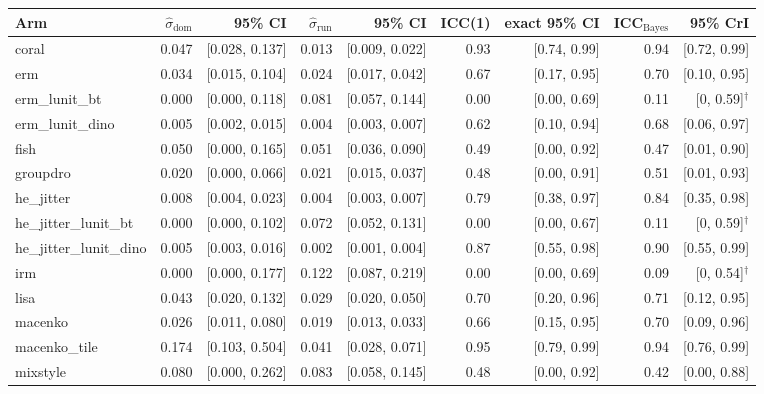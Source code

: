 \begin{tabular}{lrrrrrrrr}
\toprule
Arm & $\hat\sigma_\text{dom}$ & 95\% CI & $\hat\sigma_\text{run}$ & 95\% CI & ICC(1) & exact 95\% CI & ICC$_\text{Bayes}$ & 95\% CrI \\
\midrule
coral & 0.047 & [0.028, 0.137] & 0.013 & [0.009, 0.022] & 0.93 & [0.74, 0.99] & 0.94 & [0.72, 0.99] \\
erm & 0.034 & [0.015, 0.104] & 0.024 & [0.017, 0.042] & 0.67 & [0.17, 0.95] & 0.70 & [0.10, 0.95] \\
erm\_lunit\_bt & 0.000 & [0.000, 0.118] & 0.081 & [0.057, 0.144] & 0.00 & [0.00, 0.69] & 0.11 & [0, 0.59]$^\dagger$ \\
erm\_lunit\_dino & 0.005 & [0.002, 0.015] & 0.004 & [0.003, 0.007] & 0.62 & [0.10, 0.94] & 0.68 & [0.06, 0.97] \\
fish & 0.050 & [0.000, 0.165] & 0.051 & [0.036, 0.090] & 0.49 & [0.00, 0.92] & 0.47 & [0.01, 0.90] \\
groupdro & 0.020 & [0.000, 0.066] & 0.021 & [0.015, 0.037] & 0.48 & [0.00, 0.91] & 0.51 & [0.01, 0.93] \\
he\_jitter & 0.008 & [0.004, 0.023] & 0.004 & [0.003, 0.007] & 0.79 & [0.38, 0.97] & 0.84 & [0.35, 0.98] \\
he\_jitter\_lunit\_bt & 0.000 & [0.000, 0.102] & 0.072 & [0.052, 0.131] & 0.00 & [0.00, 0.67] & 0.11 & [0, 0.59]$^\dagger$ \\
he\_jitter\_lunit\_dino & 0.005 & [0.003, 0.016] & 0.002 & [0.001, 0.004] & 0.87 & [0.55, 0.98] & 0.90 & [0.55, 0.99] \\
irm & 0.000 & [0.000, 0.177] & 0.122 & [0.087, 0.219] & 0.00 & [0.00, 0.69] & 0.09 & [0, 0.54]$^\dagger$ \\
lisa & 0.043 & [0.020, 0.132] & 0.029 & [0.020, 0.050] & 0.70 & [0.20, 0.96] & 0.71 & [0.12, 0.95] \\
macenko & 0.026 & [0.011, 0.080] & 0.019 & [0.013, 0.033] & 0.66 & [0.15, 0.95] & 0.70 & [0.09, 0.96] \\
macenko\_tile & 0.174 & [0.103, 0.504] & 0.041 & [0.028, 0.071] & 0.95 & [0.79, 0.99] & 0.94 & [0.76, 0.99] \\
mixstyle & 0.080 & [0.000, 0.262] & 0.083 & [0.058, 0.145] & 0.48 & [0.00, 0.92] & 0.42 & [0.00, 0.88] \\

\end{tabular}
